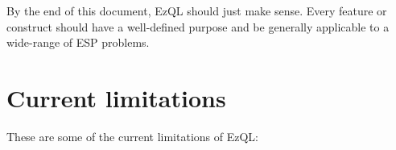 \documentclass{report}
\begin{document}





By the end of this document, EzQL should just make sense. Every
feature or construct should have a well-defined purpose and be
generally applicable to a wide-range of ESP problems.

\section{Current limitations}
\label{sec:unsolved-problems}

These are some of the current limitations of EzQL:
\end{document}
